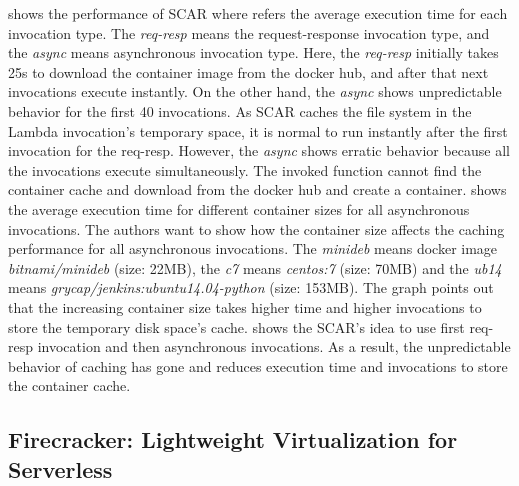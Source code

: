  shows the performance of SCAR where  refers the average execution time for each invocation type. The \textit{req-resp} means the request-response invocation type, and the \textit{async} means asynchronous invocation type. Here, the \textit{req-resp} initially takes 25s to download the container image from the docker hub, and after that next invocations execute instantly. On the other hand, the \textit{async} shows unpredictable behavior for the first 40 invocations. As SCAR caches the file system in the Lambda invocation's temporary space, it is normal to run instantly after the first invocation for the req-resp. However, the \textit{async} shows erratic behavior because all the invocations execute simultaneously. The invoked function cannot find the container cache and download from the docker hub and create a container.  shows the average execution time for different container sizes for all asynchronous invocations. The authors want to show how the container size affects the caching performance for all asynchronous invocations. The \textit{minideb} means docker image \textit{bitnami/minideb} (size: 22MB), the \textit{c7} means \textit{centos:7} (size: 70MB) and the \textit{ub14} means \textit{grycap/jenkins:ubuntu14.04-python} (size: 153MB). The graph points out that the increasing container size takes higher time and higher invocations to store the temporary disk space's cache.  shows the SCAR's idea to use first req-resp invocation and then asynchronous invocations. As a result, the unpredictable behavior of caching has gone and reduces execution time and invocations to store the container cache.


\subsection*{Firecracker: Lightweight Virtualization for Serverless}

